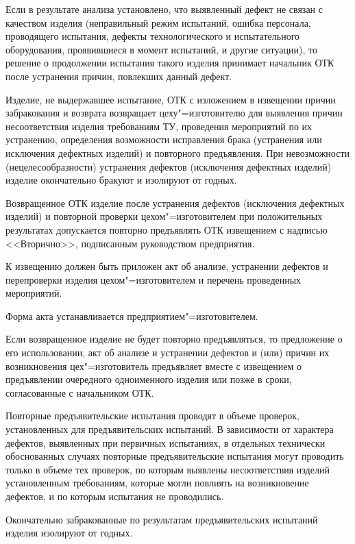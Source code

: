 \fakesection{}
Если в результате анализа установлено, что выявленный дефект не связан с качеством изделия (неправильный режим испытаний, ошибка персонала, проводящего испытания, дефекты технологического и испытательного оборудования, проявившиеся в момент испытаний, и другие ситуации), то решение о продолжении испытания такого изделия принимает начальник ОТК после устранения причин, повлекших данный дефект.

\fakesection{}
Изделие, не выдержавшее испытание, ОТК с изложением в извещении причин забракования и возврата возвращает цеху"=изготовителю для выявления причин несоответствия изделия требованиям ТУ, проведения мероприятий по их устранению, определения возможности исправления брака (устранения или исключения дефектных изделий) и повторного предъявления. При невозможности (нецелесообразности) устранения дефектов (исключения дефектных изделий) изделие окончательно бракуют и изолируют от годных.

\fakesection{}
Возвращенное ОТК изделие после устранения дефектов (исключения дефектных изделий) и повторной проверки цехом"=изготовителем при положительных результатах допускается повторно предъявлять ОТК извещением с надписью <<Вторично>>, подписанным руководством предприятия.

К извещению должен быть приложен акт об анализе, устранении дефектов и перепроверки изделия цехом"=изготовителем и перечень проведенных мероприятий.

Форма акта устанавливается предприятием"=изготовителем.

Если возвращенное изделие не будет повторно предъявляться, то предложение о его использовании, акт об анализе и устранении дефектов и (или) причин их возникновения цех"=изготовитель предъявляет вместе с извещением о предъявлении очередного одноименного изделия или позже в сроки, согласованные с начальником ОТК.

\fakesection{}
Повторные предъявительские испытания проводят в объеме проверок, установленных для предъявительских испытаний. В зависимости от характера дефектов, выявленных при первичных испытаниях, в отдельных технически обоснованных случаях повторные предъявительские испытания могут проводить только в объеме тех проверок, по которым выявлены несоответствия изделий установленным требованиям, которые могли повлиять на возникновение дефектов, и по которым испытания не проводились.

\fakesection{}
Окончательно забракованные по результатам предъявительских испытаний изделия изолируют от годных.

